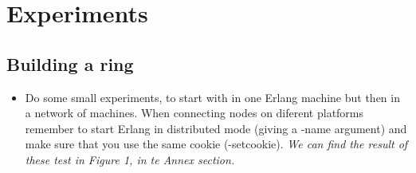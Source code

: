 \clearpage
\section{Experiments}

\subsection{Building a ring}
\begin{itemize}
\item Do some small experiments, to start with in one Erlang machine but then in a network of machines. When connecting nodes on diferent platforms remember to start Erlang in distributed mode (giving a -name argument) and make sure that you use the same cookie (-setcookie).
\newline \textit{We can find the result of these test in Figure 1, in te Annex section.}
\end{itemize}

